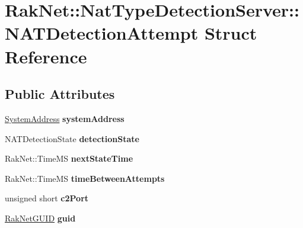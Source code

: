 \hypertarget{struct_rak_net_1_1_nat_type_detection_server_1_1_n_a_t_detection_attempt}{\section{Rak\-Net\-:\-:Nat\-Type\-Detection\-Server\-:\-:N\-A\-T\-Detection\-Attempt Struct Reference}
\label{struct_rak_net_1_1_nat_type_detection_server_1_1_n_a_t_detection_attempt}
}
\subsection*{Public Attributes}
\begin{DoxyCompactItemize}
\item 
\hypertarget{struct_rak_net_1_1_nat_type_detection_server_1_1_n_a_t_detection_attempt_aa80ae1683be2e8d7762ea310b6bc703b}{\hyperlink{struct_rak_net_1_1_system_address}{System\-Address} {\bfseries system\-Address}}\label{struct_rak_net_1_1_nat_type_detection_server_1_1_n_a_t_detection_attempt_aa80ae1683be2e8d7762ea310b6bc703b}

\item 
\hypertarget{struct_rak_net_1_1_nat_type_detection_server_1_1_n_a_t_detection_attempt_ac0bf1f54762ad595861c1311f7078791}{N\-A\-T\-Detection\-State {\bfseries detection\-State}}\label{struct_rak_net_1_1_nat_type_detection_server_1_1_n_a_t_detection_attempt_ac0bf1f54762ad595861c1311f7078791}

\item 
\hypertarget{struct_rak_net_1_1_nat_type_detection_server_1_1_n_a_t_detection_attempt_a49daf75dc1f0f84bc9e14d04ddd66211}{Rak\-Net\-::\-Time\-M\-S {\bfseries next\-State\-Time}}\label{struct_rak_net_1_1_nat_type_detection_server_1_1_n_a_t_detection_attempt_a49daf75dc1f0f84bc9e14d04ddd66211}

\item 
\hypertarget{struct_rak_net_1_1_nat_type_detection_server_1_1_n_a_t_detection_attempt_a89db43545c89494e81d5ca3de4771e85}{Rak\-Net\-::\-Time\-M\-S {\bfseries time\-Between\-Attempts}}\label{struct_rak_net_1_1_nat_type_detection_server_1_1_n_a_t_detection_attempt_a89db43545c89494e81d5ca3de4771e85}

\item 
\hypertarget{struct_rak_net_1_1_nat_type_detection_server_1_1_n_a_t_detection_attempt_ae91503019571c3f4d1bdbe5b57d1994e}{unsigned short {\bfseries c2\-Port}}\label{struct_rak_net_1_1_nat_type_detection_server_1_1_n_a_t_detection_attempt_ae91503019571c3f4d1bdbe5b57d1994e}

\item 
\hypertarget{struct_rak_net_1_1_nat_type_detection_server_1_1_n_a_t_detection_attempt_aab866a4a6df9402a75b26a8c992f7a3d}{\hyperlink{struct_rak_net_1_1_rak_net_g_u_i_d}{Rak\-Net\-G\-U\-I\-D} {\bfseries guid}}\label{struct_rak_net_1_1_nat_type_detection_server_1_1_n_a_t_detection_attempt_aab866a4a6df9402a75b26a8c992f7a3d}

\end{DoxyCompactItemize}



